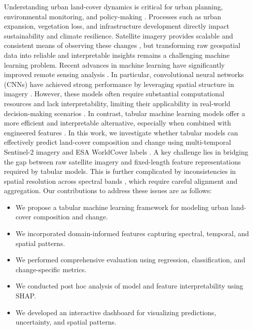 \documentclass[11pt]{article}
\begin{document}
Understanding urban land-cover dynamics is critical for urban planning, environmental monitoring, and policy-making \citep{seto2011global, angel2011making}. Processes such as urban expansion, vegetation loss, and infrastructure development directly impact sustainability and climate resilience. Satellite imagery provides scalable and consistent means of observing these changes \citep{wulder2018landsat, drusch2012sentinel2}, but transforming raw geospatial data into reliable and interpretable insights remains a challenging machine learning problem. Recent advances in machine learning have significantly improved remote sensing analysis \citep{li2021remote}.
In particular, convolutional neural networks (CNNs) have achieved strong performance by leveraging spatial structure in imagery \citep{zhu2017deeplearning}. However, these models often require substantial computational resources and lack interpretability, limiting their applicability in real-world decision-making scenarios \citep{samek2017explainable}. In contrast, tabular machine learning models offer a more efficient and interpretable alternative, especially when combined with engineered features \citep{grinsztajn2022tree, shwartz2022tabular}.
In this work, we investigate whether tabular models can effectively predict land-cover composition and change using multi-temporal Sentinel-2 imagery \citep{Sentinel2} and ESA WorldCover labels \citep{ESA_WorldCover}. A key challenge lies in bridging the gap between raw satellite imagery and fixed-length feature representations required by tabular models. This is further complicated by inconsistencies in spatial resolution across spectral bands \citep{roy2014landsat}, which require careful alignment and aggregation.
Our contributions to address these issues are as follows:
\begin{itemize}
    \item We propose a tabular machine learning framework for modeling urban land-cover composition and change.
    \item We incorporated domain-informed features capturing spectral, temporal, and spatial patterns.
    \item We performed comprehensive evaluation using regression, classification, and change-specific metrics.
    \item We conducted post hoc analysis of model and feature interpretability using SHAP.
    \item We developed an interactive dashboard for visualizing predictions, uncertainty, and spatial patterns.
\end{itemize}
\end{document}
